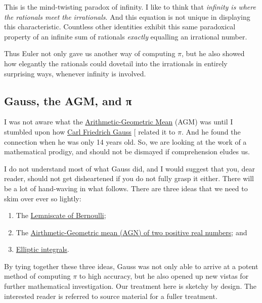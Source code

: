 \documentclass[
  a4paper,
]{article}
\begin{document}
This is the mind-twisting paradox of infinity. I like to think that
\emph{infinity is where the rationals meet the irrationals}. And this
equation is not unique in displaying this characteristic. Countless
other identities exhibit this same paradoxical property of an infinite
sum of rationals \emph{exactly} equalling an irrational number.

Thus Euler not only gave us another way of computing \(\pi\), but he
also showed how elegantly the rationals could dovetail into the
irrationals in entirely surprising ways, whenever infinity is involved.

\subsection{Gauss, the AGM, and π}\label{gauss-the-agm-and-ux3c0}

I was not aware what the
\href{https://mathworld.wolfram.com/Arithmetic-GeometricMean.html}{Arithmetic-Geometric
Mean} (AGM) was until I stumbled upon how
\href{https://en.wikipedia.org/wiki/Carl_Friedrich_Gauss}{Carl Friedrich
Gauss} {[}\citeproc{ref-gauss-wiki}{29}{]} related it to \(\pi\). And he
found the connection when he was only 14 years old. So, we are looking
at the work of a mathematical prodigy, and should not be dismayed if
comprehension eludes us.

I do not understand most of what Gauss did, and I would suggest that
you, dear reader, should not get disheartened if you do not fully grasp
it either. There will be a lot of hand-waving in what follows. There are
three ideas that we need to skim over ever so lightly:

\begin{enumerate}
\def\labelenumi{(\alph{enumi})}
\item
  The \href{https://mathworld.wolfram.com/Lemniscate.html}{Lemniscate of
  Bernoulli};
\item
  The
  \href{https://en.wikipedia.org/wiki/Arithmetic\%E2\%80\%93geometric_mean}{Airthmetic-Geometric
  mean (AGN) of two positive real numbers}; and
\item
  \href{https://en.wikipedia.org/wiki/Elliptic_integral}{Elliptic
  integrals}.
\end{enumerate}

By tying together these three ideas, Gauss was not only able to arrive
at a potent method of computing \(\pi\) to high accuracy, but he also
opened up new vistas for further mathematical investigation. Our
treatment here is sketchy by design. The interested reader is referred
to source material for a fuller treatment.
\end{document}
